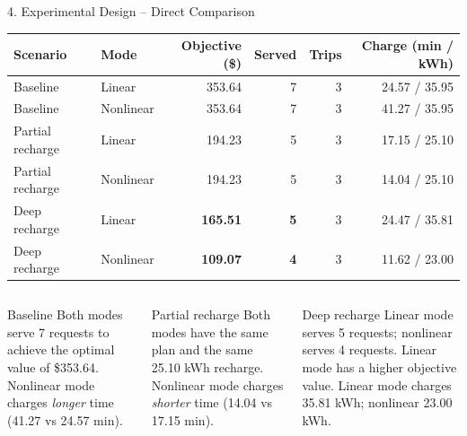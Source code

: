 \documentclass[10pt,aspectratio=169]{beamer}
\begin{document}
\begin{frame}{4. Experimental Design -- Direct Comparison}
\centering
\small
\begin{tabular}{@{}llrrrr@{}}
\toprule
\textbf{Scenario} & \textbf{Mode} & \textbf{Objective (\$)} & \textbf{Served} & \textbf{Trips} & \textbf{Charge (min / kWh)} \\
\midrule
Baseline          & Linear     & 353.64 & 7 & 3 & 24.57 / 35.95 \\
Baseline          & Nonlinear  & 353.64 & 7 & 3 & 41.27 / 35.95 \\
Partial recharge  & Linear     & 194.23 & 5 & 3 & 17.15 / 25.10 \\
Partial recharge  & Nonlinear  & 194.23 & 5 & 3 & 14.04 / 25.10 \\
Deep recharge     & Linear     & \textbf{165.51} & \textbf{5} & 3 & 24.47 / 35.81 \\
Deep recharge     & Nonlinear  & \textbf{109.07} & \textbf{4} & 3 & 11.62 / 23.00 \\
\bottomrule
\end{tabular}

\vspace{10pt}
\begin{columns}[T,onlytextwidth]
\begin{block}{Baseline}
\small Both modes serve 7 requests to achieve the optimal value of \$353.64. Nonlinear mode charges \emph{longer} time (41.27 vs 24.57 min).
\end{block}
\begin{block}{Partial recharge}
\small Both modes have the same plan and the same 25.10 kWh recharge. Nonlinear mode charges \emph{shorter} time (14.04 vs 17.15 min).
\end{block}
\begin{block}{Deep recharge}
\small Linear mode serves 5 requests; nonlinear serves 4 requests. Linear mode has a higher objective value. Linear mode charges 35.81 kWh; nonlinear 23.00 kWh.
\end{block}
\end{columns}
\end{frame}
\end{document}
